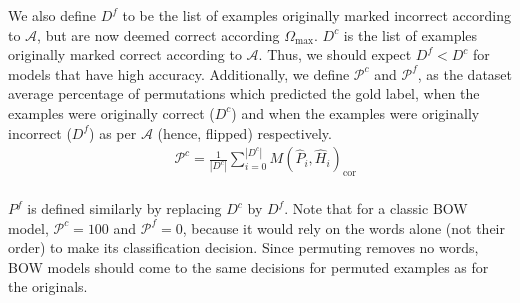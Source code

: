 \documentclass[11pt,a4paper]{article}
\begin{document}
We also define %
$D^{f}$ to be the list of examples originally marked incorrect according to $\mathcal{A}$, but are now deemed correct according $\Omega_{\text{max}}$. $D^{c}$ is the list of examples originally marked correct according to  $\mathcal{A}$. Thus, we should expect $D^{f}<D^{c}$ for models that have high accuracy. 
Additionally, we define $\mathcal{P}^c$ and $\mathcal{P}^f$, as the dataset average percentage of permutations which predicted the gold label, when the examples were originally correct ($D^{c}$) and when the examples were originally incorrect ($D^{f}$) as per $\mathcal{A}$ (hence, flipped) respectively.
\begin{equation}
\begin{split}
    &\mathcal{P}^{c} = \frac{1}{|D^{c}|} \sum_{i=0}^{|D^{c}|} M(\hat{P}_i, \hat{H}_i)_{\text{cor}}\\
\end{split}
\end{equation}

\noindent $P^f$ is defined similarly by replacing $D^c$ by $D^f$. Note that for a classic BOW model,  $\mathcal{P}^c=100$ and $\mathcal{P}^f=0$, because it would rely on the words alone (not their order) to make its classification decision. Since permuting removes no words, BOW models should come to the same decisions for permuted examples as for the originals.


\end{document}
